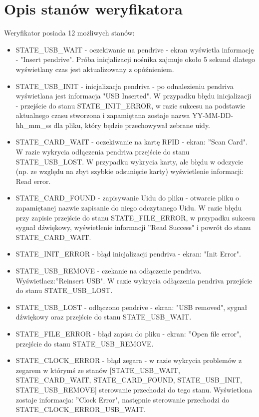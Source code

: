 \documentclass[declaration,shortabstract, mgr]{iithesis}
\begin{document}
\section{Opis stanów weryfikatora}\label{a:stany}
Weryfikator posiada 12 możliwych stanów:
\begin{itemize}
\item STATE\_USB\_WAIT - oczekiwanie na pendrive - ekran wyświetla informację - "Insert pendrive". Próba inicjalizacji nośnika zajmuje około 5 sekund dlatego wyświetlany czas jest aktualizowany z opóźnieniem.
\item STATE\_USB\_INIT - inicjalizacja pendriva - po odnalezieniu pendriva wyświetlana jest informacja "USB Inserted". W przypadku błędu inicjalizacji - przejście do stanu STATE\_INIT\_ERROR, w razie sukcesu na podstawie aktualnego czasu stworzona i zapamiętana zostaje nazwa YY-MM-DD-hh\_mm\_ss dla pliku, który będzie przechowywał zebrane uidy.
\item STATE\_CARD\_WAIT - oczekiwanie na kartę RFID - ekran: ''Scan Card". W razie wykrycia odłączenia pendriva przejście do stanu STATE\_USB\_LOST. W przypadku wykrycia karty, ale błędu w odczycie (np. ze względu na zbyt szybkie odsunięcie karty) wyświetlenie informacji: Read error.
\item STATE\_CARD\_FOUND - zapisywanie Uidu do pliku - otwarcie pliku o zapamiętanej nazwie zapisanie do niego odczytanego Uidu. W razie błędu przy zapisie przejście do stanu STATE\_FILE\_ERROR, w przypadku sukcesu sygnał dźwiękowy, wyświetlenie informacji ''Read Success" i powrót do stanu STATE\_CARD\_WAIT.
\item STATE\_INIT\_ERROR - błąd inicjalizacji pendriva - ekran: "Init Error".
\item STATE\_USB\_REMOVE - czekanie na odłączenie pendriva. Wyświetlacz:''Reinsert USB". W razie wykrycia odłączenia pendriva przejście do stanu STATE\_USB\_LOST.
\item STATE\_USB\_LOST - odłączono pendrive - ekran: "USB removed", sygnał dźwiękowy oraz przejście do stanu STATE\_USB\_WAIT.
\item STATE\_FILE\_ERROR - błąd zapisu do pliku - ekran: ''Open file error", przejście do stanu STATE\_USB\_REMOVE.
\item STATE\_CLOCK\_ERROR - błąd zegara - w razie wykrycia problemów z zegarem w którymś ze stanów [STATE\_USB\_WAIT, STATE\_CARD\_WAIT, STATE\_CARD\_FOUND, STATE\_USB\_INIT, STATE\_USB\_REMOVE] sterowanie przechodzi do tego stanu. Wyświetlona zostaje informacja: ''Clock Error", następnie sterowanie przechodzi do STATE\_CLOCK\_ERROR\_USB\_WAIT.

\end{itemize}
\end{document}

